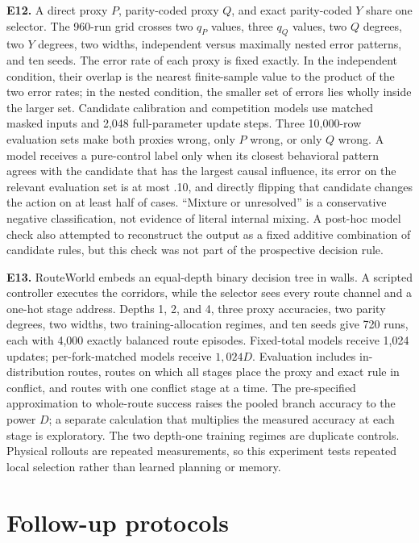 \textbf{E12.} A direct proxy $P$, parity-coded proxy $Q$, and exact parity-coded $Y$ share one selector. The 960-run grid crosses two $q_P$ values, three $q_Q$ values, two $Q$ degrees, two $Y$ degrees, two widths, independent versus maximally nested error patterns, and ten seeds. The error rate of each proxy is fixed exactly. In the independent condition, their overlap is the nearest finite-sample value to the product of the two error rates; in the nested condition, the smaller set of errors lies wholly inside the larger set. Candidate calibration and competition models use matched masked inputs and 2,048 full-parameter update steps. Three 10,000-row evaluation sets make both proxies wrong, only $P$ wrong, or only $Q$ wrong. A model receives a pure-control label only when its closest behavioral pattern agrees with the candidate that has the largest causal influence, its error on the relevant evaluation set is at most .10, and directly flipping that candidate changes the action on at least half of cases. ``Mixture or unresolved'' is a conservative negative classification, not evidence of literal internal mixing. A post-hoc model check also attempted to reconstruct the output as a fixed additive combination of candidate rules, but this check was not part of the prospective decision rule.

\textbf{E13.} RouteWorld embeds an equal-depth binary decision tree in walls. A scripted controller executes the corridors, while the selector sees every route channel and a one-hot stage address. Depths 1, 2, and 4, three proxy accuracies, two parity degrees, two widths, two training-allocation regimes, and ten seeds give 720 runs, each with 4,000 exactly balanced route episodes. Fixed-total models receive 1,024 updates; per-fork-matched models receive $1,024D$. Evaluation includes in-distribution routes, routes on which all stages place the proxy and exact rule in conflict, and routes with one conflict stage at a time. The pre-specified approximation to whole-route success raises the pooled branch accuracy to the power $D$; a separate calculation that multiplies the measured accuracy at each stage is exploratory. The two depth-one training regimes are duplicate controls. Physical rollouts are repeated measurements, so this experiment tests repeated local selection rather than learned planning or memory.

\section{Follow-up protocols}

